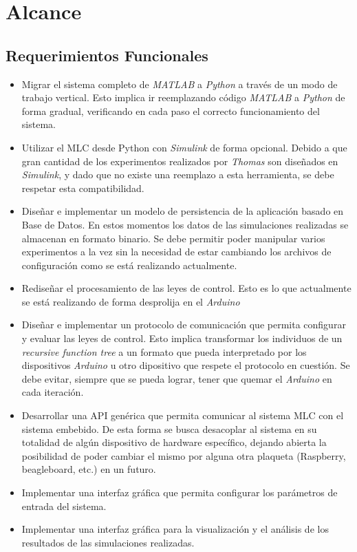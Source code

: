\documentclass[a4paper,10pt]{article}
\begin{document}
    \newpage
    \section{Alcance}
    \subsection{Requerimientos Funcionales} \label{sec:functional}
        \begin{itemize}
            \item Migrar el sistema completo de \textit{MATLAB} a \textit{Python} a través de un modo de trabajo vertical. Esto implica
            ir reemplazando código \textit{MATLAB} a \textit{Python} de forma gradual, verificando en cada paso el correcto funcionamiento
            del sistema.
            \item Utilizar el MLC desde Python con \textit{Simulink} de forma opcional. Debido a que gran cantidad de los experimentos
            realizados por \textit{Thomas} son diseñados en \textit{Simulink}, y dado que no existe una reemplazo a esta herramienta, se
            debe respetar esta compatibilidad.
            \item Diseñar e implementar un modelo de persistencia de la aplicación basado en Base de Datos. En estos momentos los datos
            de las simulaciones realizadas se almacenan en formato binario. Se debe permitir poder manipular varios experimentos a la vez
            sin la necesidad de estar cambiando los archivos de configuración como se está realizando actualmente.
            \item Rediseñar el procesamiento de las leyes de control. Esto es lo que actualmente se está realizando de forma desprolija
            en el \textit{Arduino}
            \item Diseñar e implementar un protocolo de comunicación que permita configurar y evaluar las leyes de control. Esto implica
            transformar los individuos de un \textit{recursive function tree} a un formato que pueda interpretado por los dispositivos
            \textit{Arduino} u otro dipositivo que respete el protocolo en cuestión. Se debe evitar, siempre que se pueda lograr, tener
            que quemar el \textit{Arduino} en cada iteración.
            \item Desarrollar una API genérica que permita comunicar al sistema MLC con el sistema embebido. De esta forma se busca
            desacoplar al sistema en su totalidad de algún dispositivo de hardware específico, dejando abierta la posibilidad de poder
            cambiar el mismo por alguna otra plaqueta (Raspberry, beagleboard, etc.) en un futuro.
            \item Implementar una interfaz gráfica que permita configurar los parámetros de entrada del sistema.
            \item Implementar una interfaz gráfica para la visualización y el análisis de los resultados de las simulaciones realizadas.
        \end{itemize}
\end{document}
